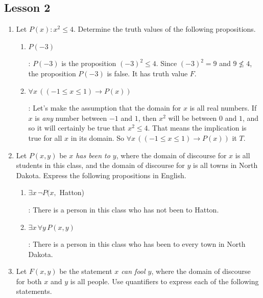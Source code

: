 \documentclass[11pt]{amsart}
\begin{document}
\subsection{Lesson 2}

\begin{enumerate}

\item Let $P(x): x^2\leq 4$. Determine the truth values of the following propositions. 

\begin{enumerate}

\item $P(-3)$

: $P(-3)$ is the proposition $(-3)^2 \leq 4$. Since $(-3)^2 = 9$ and
$9\not\leq 4$, the proposition $P(-3)$ is false. It has truth value $F$.

\item
 $\forall x\, ((-1\leq x\leq 1)\longrightarrow P(x))$

: Let's make the assumption that the domain for $x$ is all real numbers.
If $x$ is {\it any} number between $-1$ and $1$, then $x^2$ will be between
$0$ and $1$, and so it will certainly be true that $x^2\leq 4$. That means the implication is 
true for
all $x$ in its domain. \hfill\break
 So $\forall x\, ((-1\leq x\leq 1)\longrightarrow P(x))$ it $T$.

\end{enumerate}

\item Let $P(x,y)$ be {\it $x$ has been to $y$}, where the domain of discourse for 
$x$ is all students
in this class, and the domain of discourse for $y$ is all towns in North Dakota. Express the
following propositions in English. \label{negthese1}

\begin{enumerate} 

\item$\exists x\, \neg P(x,$ Hatton)

: There is a person in this class who has not been to Hatton.

\item $\exists x\, \forall y\, P(x,y)$

: There is a person in this class who has been to every town in North Dakota.

\end{enumerate}

\item Let $F(x,y)$ be the statement {\it $x$ can fool $y$}, where the domain of discourse
for both $x$ and $y$ is  all people. Use quantifiers to express each of the 
following statements. \label{negthese2}


\end{enumerate}
\end{document}
